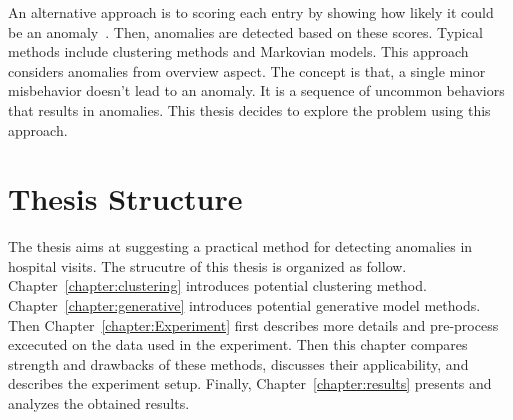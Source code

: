 An alternative approach is to scoring each entry by showing how likely it could be an anomaly~\cite{gupta2014outlier}. Then, anomalies are detected based on these scores. Typical methods include clustering methods and Markovian models. This approach considers anomalies from overview aspect. The concept is that, a single minor misbehavior doesn't lead to an anomaly. It is a sequence of uncommon behaviors that results in anomalies. This thesis decides to explore the problem using this approach.

\section{Thesis Structure}
The thesis aims at suggesting a practical method for detecting anomalies in hospital visits. The strucutre of this thesis is organized as follow. Chapter~\ref{chapter:clustering} introduces potential clustering method. Chapter~\ref{chapter:generative} introduces potential generative model methods. Then Chapter~\ref{chapter:Experiment} first describes more details and pre-process excecuted on the data used in the experiment. Then this chapter compares strength and drawbacks of these methods, discusses their applicability, and describes the experiment setup. Finally, Chapter~\ref{chapter:results} presents and analyzes the obtained results.